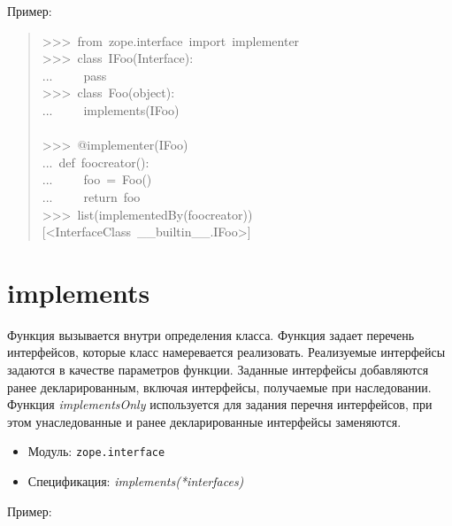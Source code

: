 \documentclass[a4paper,openany,twoside,final]{book}
\providecommand*{\DUroletitlereference}[1]{\textsl{#1}}
\begin{document}
Пример:

\begin{quote}{\ttfamily \raggedright \noindent
>{}>{}>~from~zope.interface~import~implementer\\
>{}>{}>~class~IFoo(Interface):\\
...~~~~~pass\\
>{}>{}>~class~Foo(object):\\
...~~~~~implements(IFoo)\\
~\\
>{}>{}>~@implementer(IFoo)\\
...~def~foocreator():\\
...~~~~~foo~=~Foo()\\
...~~~~~return~foo\\
>{}>{}>~list(implementedBy(foocreator))\\
{[}<InterfaceClass~\_\_builtin\_\_.IFoo>{]}
}
\end{quote}


\section*{implements%
  \label{implements}%
}

Функция вызывается внутри определения класса.  Функция задает перечень
интерфейсов, которые класс намеревается реализовать.  Реализуемые
интерфейсы задаются в качестве параметров функции.  Заданные
интерфейсы добавляются ранее декларированным, включая интерфейсы, получаемые
при наследовании.  Функция \DUroletitlereference{implementsOnly} используется для задания
перечня интерфейсов, при этом унаследованные и ранее декларированные
интерфейсы заменяются.

\begin{itemize}

\item Модуль: \texttt{zope.interface}

\item Спецификация: \DUroletitlereference{implements(*interfaces)}

\end{itemize}

Пример:
\end{document}
